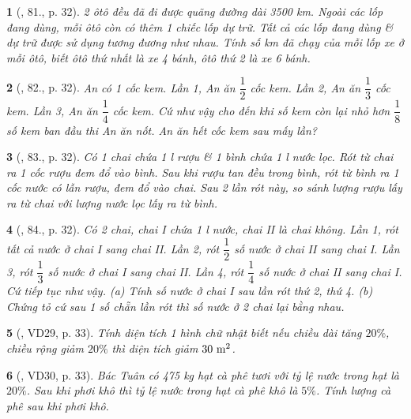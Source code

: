 \documentclass{article}
\newtheorem{baitoan}{}
\begin{document}
\begin{baitoan}[\cite{Binh_Toan_6_tap_2}, 81., p. 32]
	2 ôtô đều đã đi được quãng đường dài {\rm3500 km}. Ngoài các lốp đang dùng, mỗi ôtô còn có thêm 1 chiếc lốp dự trữ. Tất cả các lốp đang dùng \& dự trữ được sử dụng tương đương như nhau. Tính số {\rm km} đã chạy của mỗi lốp xe ở mỗi ôtô, biết ôtô thứ nhất là xe 4 bánh, ôtô thứ 2 là xe 6 bánh.
\end{baitoan}

\begin{baitoan}[\cite{Binh_Toan_6_tap_2}, 82., p. 32]
	An có 1 cốc kem. Lần 1, An ăn $\dfrac{1}{2}$ cốc kem. Lần 2, An ăn $\dfrac{1}{3}$ cốc kem. Lần 3, An ăn $\dfrac{1}{4}$ cốc kem. Cứ như vậy cho đến khi số kem còn lại nhỏ hơn $\dfrac{1}{8}$  số kem ban đầu thi An ăn nốt. An ăn hết cốc kem sau mấy lần?
\end{baitoan}

\begin{baitoan}[\cite{Binh_Toan_6_tap_2}, 83., p. 32]
	Có 1 chai chứa {\rm1 l} rượu \& 1 bình chứa {\rm1 l} nước lọc. Rót từ chai ra 1 cốc rượu đem đổ vào bình. Sau khi rượu tan đều trong bình, rót từ bình ra 1 cốc nước có lẫn rượu, đem đổ vào chai. Sau 2 lần rót này, so sánh lượng rượu lấy ra từ chai với lượng nước lọc lấy ra từ bình.
\end{baitoan}

\begin{baitoan}[\cite{Binh_Toan_6_tap_2}, 84., p. 32]
	Có 2 chai, chai I chứa {\rm1 l} nước, chai II là chai không. Lần 1, rót tất cả nước ở chai I sang chai II. Lần 2, rót $\dfrac{1}{2}$ số nước ở chai II sang chai I. Lần 3, rót $\dfrac{1}{3}$ số nước ở chai I sang chai II. Lần 4, rót $\dfrac{1}{4}$ số nước ở chai II sang chai I. Cứ tiếp tục như vậy. (a) Tính số nước ở chai I sau lần rót thứ 2, thứ 4. (b) Chứng tỏ cứ sau 1 số chẵn lần rót thì số nước ở 2 chai lại bằng nhau.
\end{baitoan}

\begin{baitoan}[\cite{Binh_Toan_6_tap_2}, VD29, p. 33]
	Tính diện tích 1 hình chữ nhật biết nếu chiều dài tăng $20\%$, chiều rộng giảm $20\%$ thì diện tích giảm $\rm30\ m^2$.
\end{baitoan}

\begin{baitoan}[\cite{Binh_Toan_6_tap_2}, VD30, p. 33]
	Bác Tuân có {\rm475 kg} hạt cà phê tươi với tỷ lệ nước trong hạt là $20\%$. Sau khi phơi khô thì tỷ lệ nước trong hạt cà phê khô là $5\%$. Tính lượng cà phê sau khi phơi khô.
\end{baitoan}
\end{document}
